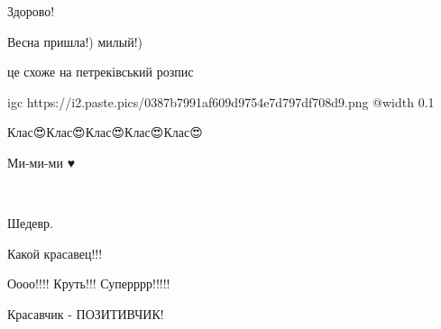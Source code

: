  
 
 
 
 

\qqSecCmt


Здорово!


Весна пришла!) милый!)


це схоже на петреківський розпис


\ifcmt
  igc https://i2.paste.pics/0387b7991af609d9754e7d797df708d9.png
  @width 0.1
\fi


Клас😍Клас😍Клас😍Клас😍Клас😍


Ми-ми-ми ♥


🙂


Шедевр.


Какой красавец!!!


Оооо!!!! Круть!!! Суперррр!!!!!


Красавчик - ПОЗИТИВЧИК!
